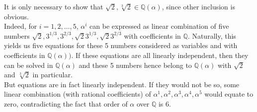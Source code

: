 \documentclass[8pt]{article} %
\newenvironment{proof}[1][Proof]{\begin{trivlist}
\item[\hskip \labelsep {\bfseries #1}]}{\qed\end{trivlist}}
\newcommand{\qed}{\nobreak \ifvmode \relax \else
\ifdim\lastskip<1.5em \hskip-\lastskip
\hskip1.5em plus0em minus0.5em \fi \nobreak
  \vrule height0.75em width0.5em depth0.25em\fi}
\begin{document}
\begin{proof}
\begin{enumerate}[label=\textbf{Step }\bfseries\arabic*.]
{			It is only necessary to show that $\sqrt{2},\sqrt[3]{2}\in\mathbb{Q}(\alpha)$, since other inclusion is obvious.\\
			Indeed, for $i=1,2,\ldots,5$, $\alpha^i$ can be expressed as linear combination of five numbers $\sqrt{2},3^{1/3},3^{2/3},
			\sqrt{2}3^{1/3},\sqrt{2}3^{2/3}$ with coefficients in $\mathbb{Q}$. Naturally, this yields us
			five equations for these 5 numbers considered as variables and with coefficients in $\mathbb{Q}(\alpha))$. If these
			equations are all linearly independent, then they can be solved in $\mathbb{Q}(\alpha)$ and these 5 numbers
			hence belong to $\mathbb{Q}(\alpha)$ with $\sqrt{2}$ and $\sqrt[3]{2}$ in particular.\\
			But equations are in fact linearly independent. If they would not be so, some linear combination (with rational
			coefficients) of $\alpha^1,\alpha^2,\alpha^3,\alpha^4,\alpha^5$ would equate to zero, contradicting the fact
			that order of $\alpha$ over $\mathbb{Q}$ is 6.
			}
	\end{enumerate}
\end{proof}
\end{document}
